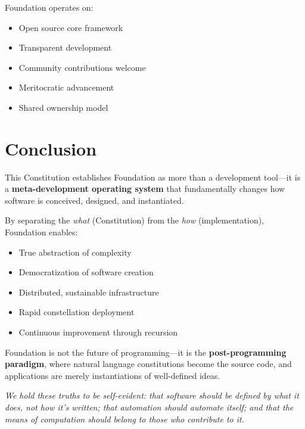 \documentclass[12pt,letterpaper]{article}
\begin{document}
Foundation operates on:

\begin{itemize}
    \item Open source core framework
    \item Transparent development
    \item Community contributions welcome
    \item Meritocratic advancement
    \item Shared ownership model
\end{itemize}

\section{Conclusion}

This Constitution establishes Foundation as more than a development tool—it is a \textbf{meta-development operating system} that fundamentally changes how software is conceived, designed, and instantiated.

By separating the \textit{what} (Constitution) from the \textit{how} (implementation), Foundation enables:

\begin{itemize}
    \item True abstraction of complexity
    \item Democratization of software creation
    \item Distributed, sustainable infrastructure
    \item Rapid constellation deployment
    \item Continuous improvement through recursion
\end{itemize}

Foundation is not the future of programming—it is the \textbf{post-programming paradigm}, where natural language constitutions become the source code, and applications are merely instantiations of well-defined ideas.

\vspace{1cm}

\begin{center}
\textit{We hold these truths to be self-evident: that software should be defined by what it does, not how it's written; that automation should automate itself; and that the means of computation should belong to those who contribute to it.}
\end{center}
\end{document}
